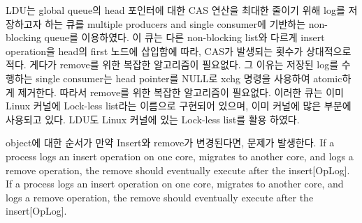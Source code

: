 
\ifkor
LDU는 global queue의 head 포인터에 대한 CAS 연산을 최대한 줄이기 위해  log를 저장하고자 하는 큐를 multiple
producers and single consumer에 기반하는 non-blocking queue를 이용하였다. 
이 큐는 다른 non-blocking list와 다르게 insert operation을 head의 first 노드에 삽입함에 따라, CAS가
발생되는 횟수가 상대적으로 적다. 
게다가 remove를 위한 복잡한 알고리즘이 필요없다.
그 이유는 저장된 log를 수행하는 single consumer는 head  pointer를 NULL로 xchg 명령을 사용하여
atomic하게 제거한다.
따라서 remove를 위한 복잡한 알고리즘이 필요없다.
이러한 큐는 이미 Linux 커널에 Lock-less list라는 이름으로 구현되어 있으며, 이미 커널에 많은 부분에 사용되고 있다.
LDU도 Linux 커널에 있는 Lock-less list를 활용 하였다.
\else
\fi












\ifkor
object에 대한 순서가 만약 Insert와 remove가 변경된다면, 문제가 발생한다. 
If a process logs an insert operation on one core,
migrates to another core, and logs a remove operation, the remove should
eventually execute after the insert[OpLog].
\else
If a process logs an insert operation on one core,
migrates to another core, and logs a remove operation, the remove should
eventually execute after the insert[OpLog].
\fi











